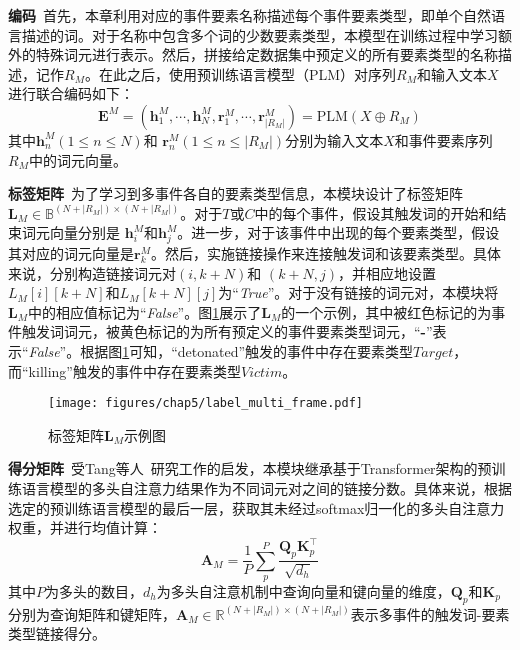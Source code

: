 \textbf{编码}~首先，本章利用对应的事件要素名称描述每个事件要素类型，即单个自然语言描述的词。对于名称中包含多个词的少数要素类型，本模型在训练过程中学习额外的特殊词元进行表示。然后，拼接给定数据集中预定义的所有要素类型的名称描述，记作$R_{M}$。在此之后，使用预训练语言模型（PLM）对序列$R_{M}$和输入文本$X$进行联合编码如下：
\begin{equation}
\boldsymbol{E}^{M} = (\boldsymbol{h}_{1}^{M}, \cdots, \boldsymbol{h}_{N}^{M}, \boldsymbol{r}_{1}^{M}, \cdots, \boldsymbol{r}_{|R_{M}|}^{M}) =\textrm{PLM}(X \oplus R_{M})
\end{equation}
其中$\boldsymbol{h}_{n}^{M} \left(1 \leq n \leq N\right)$和 $\boldsymbol{r}_{n}^{M} \left(1 \leq n \leq |R_{M}|\right)$分别为输入文本$X$和事件要素序列$R_{M}$中的词元向量。

\textbf{标签矩阵}~为了学习到多事件各自的要素类型信息，本模块设计了标签矩阵$\boldsymbol{L}_{M} \in {\mathbb{B}}^{(N+|R_{M}|) \times (N+|R_{M}|)}$。对于$T$或$C$中的每个事件，假设其触发词的开始和结束词元向量分别是
$\boldsymbol{h}_{i}^{M}$和$\boldsymbol{h}_{j}^{M}$。进一步，对于该事件中出现的每个要素类型，假设其对应的词元向量是$\boldsymbol{r}_{k}^{M}$。然后，实施链接操作来连接触发词和该要素类型。具体来说，分别构造链接词元对$(i,k+N)$和 $(k+N,j)$，并相应地设置${L}_{M}[i][k+N]$和${L}_{M}[k+N][j]$为“\emph{True}”。对于没有链接的词元对，本模块将$\boldsymbol{L}_{M}$中的相应值标记为“\emph{False}”。图\ref{multi_event_label}展示了$\boldsymbol{L}_{M}$的一个示例，其中被红色标记的为事件触发词词元，被黄色标记的为所有预定义的事件要素类型词元，“\textbf{-}”表示“\emph{False}”。根据图\ref{multi_event_label}可知，“detonated”触发的事件中存在要素类型$Target$，而“killing”触发的事件中存在要素类型$Victim$。

\begin{figure}[htp]
\centering
\texttt{[image: figures/chap5/label\_multi\_frame.pdf]}
\caption{标签矩阵$\boldsymbol{L}_{M}$示例图}
\label{multi_event_label}
\end{figure}

\textbf{得分矩阵}~受Tang等人~\cite{tang2022unirel}研究工作的启发，本模块继承基于Transformer架构的预训练语言模型的多头自注意力结果作为不同词元对之间的链接分数。具体来说，根据选定的预训练语言模型的最后一层，获取其未经过softmax归一化的多头自注意力权重，并进行均值计算：
\begin{equation}
\boldsymbol{A}_{M}=\frac{1}{P} \sum_p^P \frac{\boldsymbol{Q}_{p} \boldsymbol{K}_{p}^\top}{\sqrt{d_h}}
\label{scores}
\end{equation}
其中$P$为多头的数目，$d_h$为多头自注意机制中查询向量和键向量的维度，$\boldsymbol{Q}_{p}$和$\boldsymbol{K}_{p}$分别为查询矩阵和键矩阵，$\boldsymbol{A}_{M} \in {\mathbb{R}}^{(N+|R_{M}|) \times (N+|R_{M}|)}$表示多事件的触发词-要素类型链接得分。

